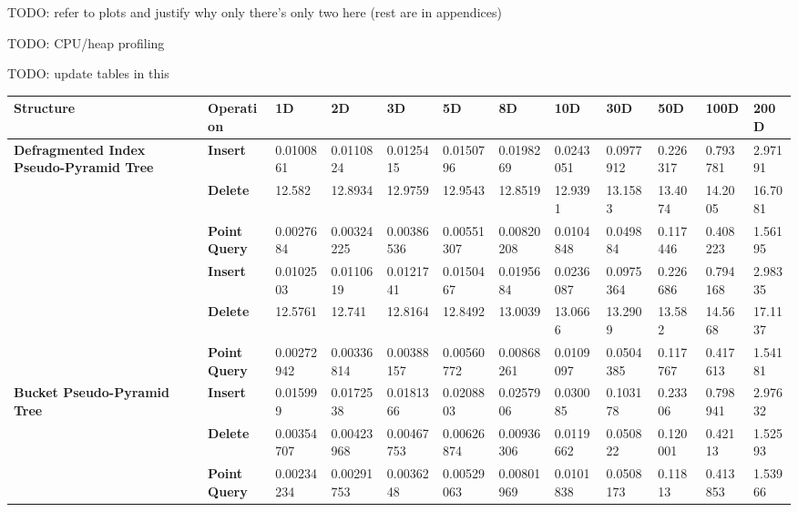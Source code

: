 TODO: refer to plots and justify why only there's only two here (rest are in appendices)

TODO: CPU/heap profiling

\begin{landscape}

	TODO: update tables in this

	\begin{table}
		\centering
		\begin{tabular}{|p{2cm}|l|l|l|l|l|l|l|l|l|l|l|}
			\hline
			\textbf{Structure} & \textbf{Operation} & \textbf{1D} & \textbf{2D} & \textbf{3D} & \textbf{5D} & \textbf{8D} & \textbf{10D} & \textbf{30D} & \textbf{50D} & \textbf{100D} & \textbf{200D} \\
			\hline
			\multirow{ 4}{*}{\textbf{Defragmented Index Pseudo-Pyramid Tree}} & \textbf{Insert} & 0.0100861 & 0.0110824 & 0.0125415 & 0.0150796 & 0.0198269 & 0.0243051 & 0.0977912 & 0.226317 & 0.793781 & 2.97191 \\
			 & \textbf{Delete} & 12.582 & 12.8934 & 12.9759 & 12.9543 & 12.8519 & 12.9391 & 13.1583 & 13.4074 & 14.2005 & 16.7081 \\
			 & \textbf{Point Query} & 0.0027684 & 0.00324225 & 0.00386536 & 0.00551307 & 0.00820208 & 0.0104848 & 0.049884 & 0.117446 & 0.408223 & 1.56195 \\
			\hline
			\multirow{ 4}{*}{\textbf{Rebuild Index Pseudo-Pyramid Tree}} & \textbf{Insert} & 0.0102503 & 0.0110619 & 0.0121741 & 0.0150467 & 0.0195684 & 0.0236087 & 0.0975364 & 0.226686 & 0.794168 & 2.98335 \\
			 & \textbf{Delete} & 12.5761 & 12.741 & 12.8164 & 12.8492 & 13.0039 & 13.0666 & 13.2909 & 13.582 & 14.5668 & 17.1137 \\
			 & \textbf{Point Query} & 0.00272942 & 0.00336814 & 0.00388157 & 0.00560772 & 0.00868261 & 0.0109097 & 0.0504385 & 0.117767 & 0.417613 & 1.54181 \\
			\hline
			\multirow{ 4}{*}{\textbf{Bucket Pseudo-Pyramid Tree}} & \textbf{Insert} & 0.015999 & 0.0172538 & 0.0181366 & 0.0208803 & 0.0257906 & 0.030085 & 0.103178 & 0.23306 & 0.798941 & 2.97632 \\
			 & \textbf{Delete} & 0.00354707 & 0.00423968 & 0.00467753 & 0.00626874 & 0.00936306 & 0.0119662 & 0.050822 & 0.120001 & 0.42113 & 1.52593 \\
			 & \textbf{Point Query} & 0.00234234 & 0.00291753 & 0.0036248 & 0.00529063 & 0.00801969 & 0.0101838 & 0.0508173 & 0.11813 & 0.413853 & 1.53966 \\
			\hline

\end{tabular}
\end{table}
\end{landscape}
